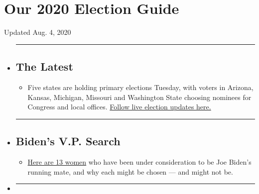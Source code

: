 \hypertarget{our-2020-election-guide}{%
\section{Our 2020 Election Guide}\label{our-2020-election-guide}}

Updated Aug. 4, 2020

\begin{itemize}
\item
  \begin{center}\rule{0.5\linewidth}{\linethickness}\end{center}

  \hypertarget{the-latest}{%
  \subsection{The Latest}\label{the-latest}}

  \begin{itemize}
  \tightlist
  \item
    Five states are holding primary elections Tuesday, with voters in
    Arizona, Kansas, Michigan, Missouri and Washington State choosing
    nominees for Congress and local offices.
    \href{https://www.nytimes.com/2020/08/04/us/elections/primary-election-michigan-arizona-kansas.html?action=click\&pgtype=Article\&state=default\&region=BELOW_MAIN_CONTENT\&context=storylines_guide}{Follow
    live election updates here.}
  \end{itemize}
\item
  \begin{center}\rule{0.5\linewidth}{\linethickness}\end{center}

  \hypertarget{bidens-vp-search}{%
  \subsection{Biden's V.P. Search}\label{bidens-vp-search}}

  \begin{itemize}
  \tightlist
  \item
    \href{https://www.nytimes.com/article/biden-vice-president-2020.html?action=click\&pgtype=Article\&state=default\&region=BELOW_MAIN_CONTENT\&context=storylines_guide}{Here
    are 13 women} who have been under consideration to be Joe Biden's
    running mate, and why each might be chosen --- and might not be.
  \end{itemize}
\item
  \begin{center}\rule{0.5\linewidth}{\linethickness}\end{center}


\end{itemize}
